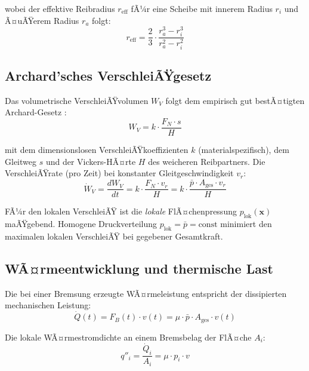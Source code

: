 ﻿\documentclass[12pt,a4paper]{article}
\theoremstyle{definition}
\begin{document}
\noindent wobei der effektive Reibradius $r_{\text{eff}}$ fÃ¼r eine
Scheibe mit innerem Radius $r_i$ und Ã¤uÃŸerem Radius $r_a$ folgt:
\begin{equation}
  r_{\text{eff}} = \frac{2}{3} \cdot \frac{r_a^3 - r_i^3}{r_a^2 - r_i^2}
  \label{eq:r_eff}
\end{equation}

\subsection{Archard'sches VerschleiÃŸgesetz}

Das volumetrische VerschleiÃŸvolumen $W_V$ folgt dem empirisch gut bestÃ¤tigten
Archard-Gesetz \cite{archard1953}:
\begin{equation}
  W_V = k \cdot \frac{F_N \cdot s}{H}
  \label{eq:archard}
\end{equation}

mit dem dimensionslosen VerschleiÃŸkoeffizienten $k$ (materialspezifisch),
dem Gleitweg $s$ und der Vickers-HÃ¤rte $H$ des weicheren Reibpartners.
Die VerschleiÃŸrate (pro Zeit) bei konstanter Gleitgeschwindigkeit $v_r$:
\begin{equation}
  \dot{W}_V = \frac{dW_V}{dt} = k \cdot \frac{F_N \cdot v_r}{H}
            = k \cdot \frac{\bar{p} \cdot A_{\text{ges}} \cdot v_r}{H}
  \label{eq:verschleissrate}
\end{equation}

FÃ¼r den lokalen VerschleiÃŸ ist die \emph{lokale} FlÃ¤chenpressung
$p_{\text{lok}}(\mathbf{x})$ maÃŸgebend.  Homogene Druckverteilung
$p_{\text{lok}} = \bar{p} = \text{const}$ minimiert den maximalen
lokalen VerschleiÃŸ bei gegebener Gesamtkraft.

\subsection{WÃ¤rmeentwicklung und thermische Last}

Die bei einer Bremsung erzeugte WÃ¤rmeleistung entspricht der dissipierten
mechanischen Leistung:
\begin{equation}
  \dot{Q}(t) = F_B(t) \cdot v(t) = \mu \cdot \bar{p} \cdot A_{\text{ges}} \cdot v(t)
  \label{eq:waermeleistung}
\end{equation}

Die lokale WÃ¤rmestromdichte an einem Bremsbelag der FlÃ¤che $A_i$:
\begin{equation}
  q''_i = \frac{\dot{Q}_i}{A_i} = \mu \cdot p_i \cdot v
  \label{eq:waermestromdichte}
\end{equation}
\end{document}
